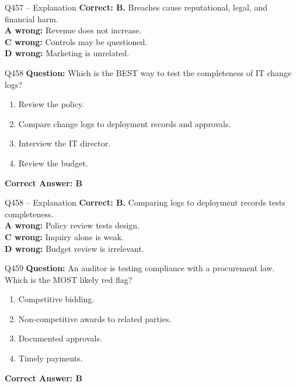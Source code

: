 \documentclass[aspectratio=169,10pt]{beamer}
\begin{document}
	\begin{frame}[t]{Q457 -- Explanation}
		\small
		\textbf{Correct: B.} Breaches cause reputational, legal, and financial harm. \\[4pt]
		\textbf{A wrong:} Revenue does not increase. \\[2pt]
		\textbf{C wrong:} Controls may be questioned. \\[2pt]
		\textbf{D wrong:} Marketing is unrelated.
	\end{frame}
	
	\begin{frame}[t]{Q458}
		\small
		\textbf{Question:} Which is the BEST way to test the completeness of IT change logs?
		\begin{enumerate}[label=\Alph*.,itemsep=1pt,topsep=2pt]
			\item Review the policy.
			\item Compare change logs to deployment records and approvals.
			\item Interview the IT director.
			\item Review the budget.
		\end{enumerate}
		\vspace{4pt}
		\textbf{Correct Answer: B}
	\end{frame}
	
	\begin{frame}[t]{Q458 -- Explanation}
		\small
		\textbf{Correct: B.} Comparing logs to deployment records tests completeness. \\[4pt]
		\textbf{A wrong:} Policy review tests design. \\[2pt]
		\textbf{C wrong:} Inquiry alone is weak. \\[2pt]
		\textbf{D wrong:} Budget review is irrelevant.
	\end{frame}
	
	\begin{frame}[t]{Q459}
		\small
		\textbf{Question:} An auditor is testing compliance with a procurement law. Which is the MOST likely red flag?
		\begin{enumerate}[label=\Alph*.,itemsep=1pt,topsep=2pt]
			\item Competitive bidding.
			\item Non-competitive awards to related parties.
			\item Documented approvals.
			\item Timely payments.
		\end{enumerate}
		\vspace{4pt}
		\textbf{Correct Answer: B}
	\end{frame}
	
\end{document}
